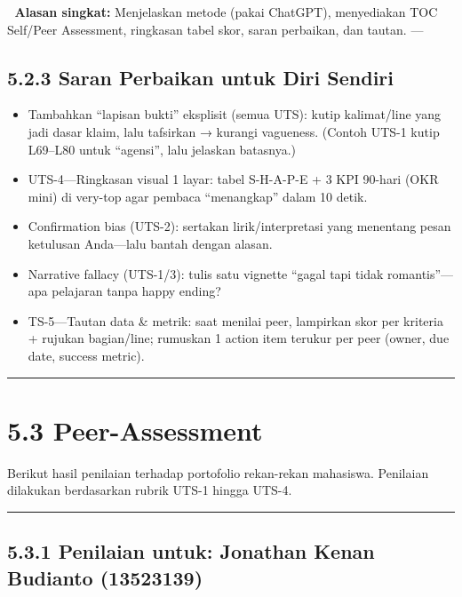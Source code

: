 \documentclass[
  letterpaper,
  DIV=11,
  numbers=noendperiod]{scrreprt}
\providecommand{\tightlist}{%
  \setlength{\itemsep}{0pt}\setlength{\parskip}{0pt}}
\begin{document}
📝 \textbf{Alasan singkat:} Menjelaskan metode (pakai ChatGPT),
menyediakan TOC Self/Peer Assessment, ringkasan tabel skor, saran
perbaikan, dan tautan. ---

\subsection{5.2.3 Saran Perbaikan untuk Diri
Sendiri}\label{saran-perbaikan-untuk-diri-sendiri}

\begin{itemize}
\tightlist
\item
  Tambahkan ``lapisan bukti'' eksplisit (semua UTS): kutip kalimat/line
  yang jadi dasar klaim, lalu tafsirkan → kurangi vagueness. (Contoh
  UTS-1 kutip L69--L80 untuk ``agensi'', lalu jelaskan batasnya.)
\item
  UTS-4---Ringkasan visual 1 layar: tabel S-H-A-P-E + 3 KPI 90-hari (OKR
  mini) di very-top agar pembaca ``menangkap'' dalam 10 detik.
\item
  Confirmation bias (UTS-2): sertakan lirik/interpretasi yang menentang
  pesan ketulusan Anda---lalu bantah dengan alasan.
\item
  Narrative fallacy (UTS-1/3): tulis satu vignette ``gagal tapi tidak
  romantis''---apa pelajaran tanpa happy ending?
\item
  TS-5---Tautan data \& metrik: saat menilai peer, lampirkan skor per
  kriteria + rujukan bagian/line; rumuskan 1 action item terukur per
  peer (owner, due date, success metric).
\end{itemize}

\begin{center}\rule{0.5\linewidth}{0.5pt}\end{center}

\section{5.3 Peer-Assessment}\label{peer-assessment}

Berikut hasil penilaian terhadap portofolio rekan-rekan mahasiswa.
Penilaian dilakukan berdasarkan rubrik UTS-1 hingga UTS-4.

\begin{center}\rule{0.5\linewidth}{0.5pt}\end{center}

\subsection{5.3.1 Penilaian untuk: Jonathan Kenan Budianto
(13523139)}\label{penilaian-untuk-jonathan-kenan-budianto-13523139}
\end{document}
